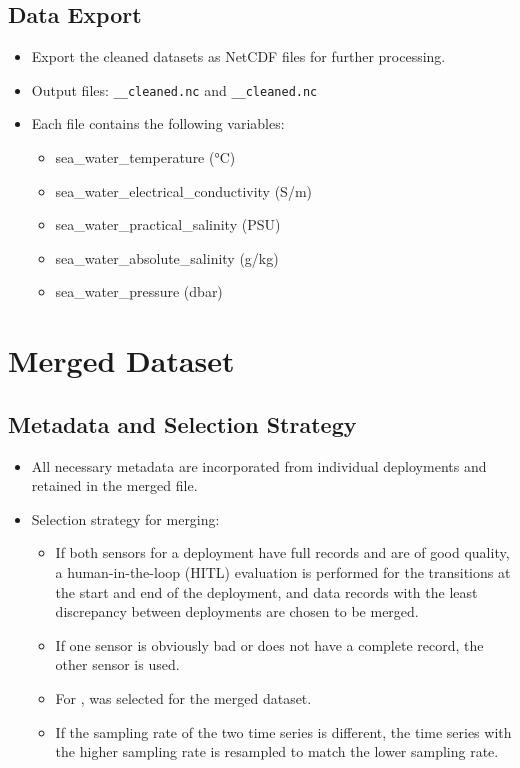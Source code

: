 \subsection{Data Export}

\begin{itemize}
\item Export the cleaned datasets as NetCDF files for further processing.
\item Output files: 
\texttt{\projectname\casenumber\_\FirstInstrument\_cleaned.nc} 
and \texttt{\projectname\casenumber\_\SecondInstrument\_cleaned.nc}
\item Each file contains the following variables:
\begin{itemize}
    \item sea\_water\_temperature (°C)
    \item sea\_water\_electrical\_conductivity (S/m)
    \item sea\_water\_practical\_salinity (PSU)
    \item sea\_water\_absolute\_salinity (g/kg)
    \item sea\_water\_pressure (dbar)
\end{itemize}
\end{itemize}   

\section{Merged Dataset}

\subsection{Metadata and Selection Strategy}
\begin{itemize}
    \item All necessary metadata are incorporated from individual deployments and retained in the merged file.
    \item Selection strategy for merging:
    \begin{itemize}
        \item If both sensors for a deployment have full records and are of good quality, 
        a human-in-the-loop (HITL) evaluation is performed for the transitions at the start and end of the deployment, 
        and data records with the least discrepancy between deployments are chosen to be merged. 
        \item If one sensor is obviously bad or does not have a complete record, the other sensor is used.
        \item For \displayprojectname{} \casenumber{}, \CurrentDeploymentInstrument{} was selected for the merged dataset.
        \item If the sampling rate of the two time series is different, the time series with the higher sampling rate is resampled to match the lower sampling rate.
    \end{itemize}
\end{itemize}

